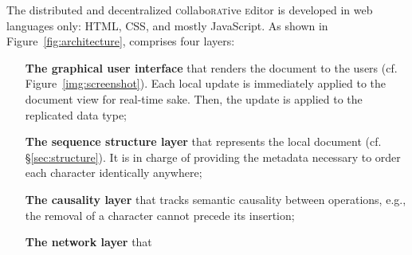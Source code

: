The distributed and decentralized \textsc{c}ollabo\textsc{rat}ive
\textsc{e}ditor \CRATE is developed in web languages only: HTML, CSS, and mostly
JavaScript. As shown in Figure~\ref{fig:architecture}, \CRATE comprises four
layers:
\begin{itemize}
\item [\textbf{The graphical user interface}] that renders the document to the users
  (cf. Figure~\ref{img:screenshot}). Each local update is immediately applied to
  the document view for real-time sake. Then, the update is applied to the
  replicated data type;
\item [\textbf{The sequence structure layer}] that represents the local document
  (cf. §\ref{sec:structure}). It is in charge of providing the metadata
  necessary to order each character identically anywhere;
\item [\textbf{The causality layer}] that tracks semantic causality between operations,
  e.g., the removal of a character cannot precede its insertion;
\item [\textbf{The network layer}] that
\end{itemize}



